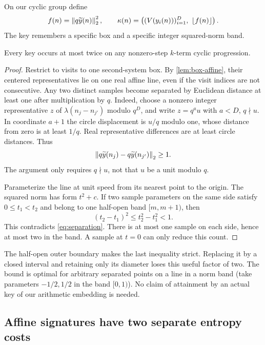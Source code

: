 On our cyclic group define
\begin{equation}\label{eq:keys}
 f(n)=\left\lVert q\widetilde y(n)\right\rVert_2^2,\qquad
 \kappa(n)=\left((V(y_i(n)))_{i=1}^D,\ \left\lfloor f(n)\right\rfloor\right).
\end{equation}
The key remembers a specific box and a specific integer squared-norm
band.

\begin{lemma}\label{lem:multiplicity}
Every key occurs at most twice on any nonzero-step \(k\)-term cyclic
progression.
\end{lemma}

\begin{proof}
Restrict to visits to one second-system box. By
\cref{lem:box-affine}, their centered representatives lie on one real
affine line, even if the visit indices are not consecutive.
Any two distinct samples become separated by Euclidean distance at
least one after multiplication by \(q\).
Indeed, choose a nonzero integer representative \(z\) of
\(\lambda(n_j-n_{j'})\) modulo \(q^D\), and write \(z=q^a u\)
with \(a<D\), \(q\nmid u\).
In coordinate \(a+1\) the circle displacement is \(u/q\) modulo one,
whose distance from zero is at least \(1/q\).
Real representative differences are at least circle distances.
Thus
\begin{equation}\label{eq:separation}
 \left\lVert q\widetilde y(n_j)-q\widetilde y(n_{j'})\right\rVert_2\ge1.
\end{equation}
The argument only requires \(q\nmid u\), not that \(u\) be a unit
modulo \(q\).

Parameterize the line at unit speed from its nearest point to the
origin. The squared norm has form \(t^2+c\).
If two sample parameters on the same side satisfy \(0\le t_1<t_2\)
and belong to one half-open band \([m,m+1)\), then
\[
 (t_2-t_1)^2\le t_2^2-t_1^2<1.
\]
This contradicts \eqref{eq:separation}.
There is at most one sample on each side, hence at most two in the
band. A sample at \(t=0\) can only reduce this count.
\end{proof}

The half-open outer boundary makes the last inequality strict.
Replacing it by a closed interval and retaining only its diameter
loses this useful factor of two.
The bound is optimal for arbitrary separated points on a line in a
norm band (take parameters \(-1/2,1/2\) in the band \([0,1)\)).
No claim of attainment by an actual key of our arithmetic embedding
is needed.

\subsection{Affine signatures have two separate entropy costs}

